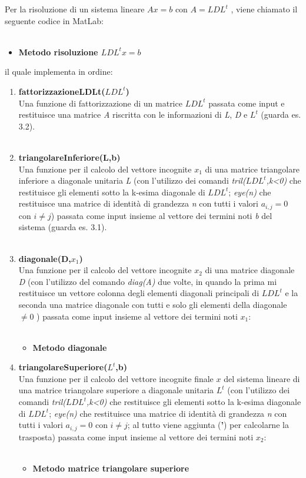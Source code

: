 Per la risoluzione di un sistema lineare $Ax=b$ con $A=LDL^t$ , viene chiamato il seguente codice in MatLab:\\\
\begin{itemize}
\item \textbf{Metodo risoluzione $LDL^tx=b$}

\end{itemize}
il quale implementa in ordine:
\begin{enumerate}
\item \textbf{fattorizzazioneLDLt($LDL^t$)}\\
Una funzione di fattorizzazione di un matrice $LDL^t$ passata come input e restituisce una matrice \textit{A} riscritta con le informazioni di \textit{L}, \textit{D} e $L^t$ (guarda es. 3.2).\\\
\item \textbf{triangolareInferiore(L,b)}\\
Una funzione per il calcolo del vettore incognite $x_1$ di una matrice triangolare inferiore a diagonale unitaria \textit{L} (con l'utilizzo dei comandi \textit{tril($LDL^t$,k<0)} che restituisce gli elementi sotto la k-esima diagonale di $LDL^t$; \textit{eye(n)} che restituisce una matrice di identità di grandezza \textit{n} con tutti i valori $a_{i,j}=0$ con $i \neq j$) passata come input insieme al vettore dei termini noti \textit{b} del sistema (guarda es. 3.1). \\\
\item \textbf{diagonale(D,$x_1$)}\\
Una funzione per il calcolo del vettore incognite $x_2$ di una matrice diagonale \textit{D} (con l'utilizzo del comando \textit{diag(A)} due volte, in quando la prima mi restituisce un vettore colonna degli elementi diagonali principali di $LDL^t$ e la seconda una matrice diagonale con tutti e solo gli elementi della diagonale $\neq 0$ ) passata come input insieme al vettore dei termini noti $x_1$:\\\
\begin{itemize}
\item \textbf{Metodo diagonale}

\end{itemize}
\item \textbf{triangolareSuperiore($L^t$,b)}\\
Una funzione per il calcolo del vettore incognite finale $x$ del sistema lineare di una matrice triangolare superiore a diagonale unitaria \textit{$L^t$} (con l'utilizzo dei comandi \textit{tril($LDL^t$,k<0)} che restituisce gli elementi sotto la k-esima diagonale di $LDL^t$; \textit{eye(n)} che restituisce una matrice di identità di grandezza \textit{n} con tutti i valori $a_{i,j}=0$ con $i \neq j$; al tutto viene aggiunta (\textbf{'}) per calcolarne la trasposta) passata come input insieme al vettore dei termini noti $x_2$:\\\
\begin{itemize}
\item \textbf{Metodo matrice triangolare superiore}

\end{itemize}
\end{enumerate}